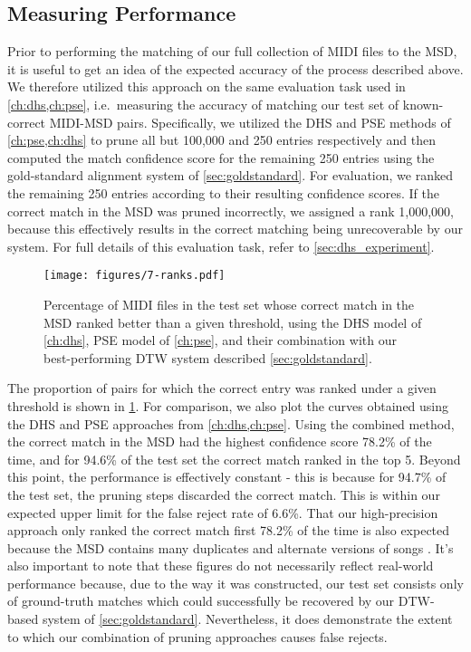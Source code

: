 \subsection{Measuring Performance}

Prior to performing the matching of our full collection of MIDI files to the MSD, it is useful to get an idea of the expected accuracy of the process described above.
We therefore utilized this approach on the same evaluation task used in \cref{ch:dhs,ch:pse}, i.e.\ measuring the accuracy of matching our test set of known-correct MIDI-MSD pairs.
Specifically, we utilized the DHS and PSE methods of \cref{ch:pse,ch:dhs} to prune all but 100,000 and 250 entries respectively and then computed the match confidence score for the remaining 250 entries using the gold-standard alignment system of \cref{sec:goldstandard}.
For evaluation, we ranked the remaining 250 entries according to their resulting confidence scores.
If the correct match in the MSD was pruned incorrectly, we assigned a rank 1,000,000, because this effectively results in the correct matching being unrecoverable by our system.
For full details of this evaluation task, refer to \cref{sec:dhs_experiment}.

\begin{figure}
  \texttt{[image: figures/7-ranks.pdf]}
  \caption[Percentage of the test set below a given rank]{Percentage of MIDI files in the test set whose correct match in the MSD ranked better than a given threshold, using the DHS model of \cref{ch:dhs}, PSE model of \cref{ch:pse}, and their combination with our best-performing DTW system described \cref{sec:goldstandard}.}
  \label{fig:combined_ranks}
\end{figure}

The proportion of pairs for which the correct entry was ranked under a given threshold is shown in \cref{fig:combined_ranks}.
For comparison, we also plot the curves obtained using the DHS and PSE approaches from \cref{ch:dhs,ch:pse}.
Using the combined method, the correct match in the MSD had the highest confidence score 78.2\% of the time, and for 94.6\% of the test set the correct match ranked in the top 5.
Beyond this point, the performance is effectively constant - this is because for 94.7\% of the test set, the pruning steps discarded the correct match.
This is within our expected upper limit for the false reject rate of 6.6\%.
That our high-precision approach only ranked the correct match first 78.2\% of the time is also expected because the MSD contains many duplicates and alternate versions of songs \cite{bertin2012large}.
It's also important to note that these figures do not necessarily reflect real-world performance because, due to the way it was constructed, our test set consists only of ground-truth matches which could successfully be recovered by our DTW-based system of \cref{sec:goldstandard}.
Nevertheless, it does demonstrate the extent to which our combination of pruning approaches causes false rejects.

